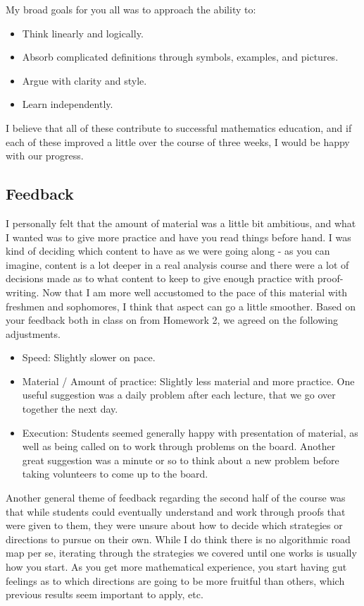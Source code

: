 \documentclass[11pt]{article}
\theoremstyle{plain}
\theoremstyle{definition}
\theoremstyle{remark}
\begin{document}
My broad goals for you all was to approach the ability to:
\begin{itemize}
    \item Think linearly and logically.
    \item Absorb complicated definitions through symbols, examples, and pictures.
    \item Argue with clarity and style.
    \item Learn independently.
\end{itemize}
I believe that all of these contribute to successful mathematics education, and if each of these improved a little over the course of three weeks, I would be happy with our progress.

\subsection*{Feedback}

I personally felt that the amount of material was a little bit ambitious, and what I wanted was to give more practice and have you read things before hand. I was kind of deciding which content to have as we were going along - as you can imagine, content is a lot deeper in a real analysis course and there were a lot of decisions made as to what content to keep to give enough practice with proof-writing. Now that I am more well accustomed to the pace of this material with freshmen and sophomores, I think that aspect can go a little smoother. Based on your feedback both in class on from Homework 2, we agreed on the following adjustments.
\begin{itemize}
    \item Speed: Slightly slower on pace.
    \item Material / Amount of practice: Slightly less material and more practice. One useful suggestion was a daily problem after each lecture, that we go over together the next day.
    \item Execution: Students seemed generally happy with presentation of material, as well as being called on to work through problems on the board. Another great suggestion was a minute or so to think about a new problem before taking volunteers to come up to the board.
\end{itemize}

Another general theme of feedback regarding the second half of the course was that while students could eventually understand and work through proofs that were given to them, they were unsure about how to decide which strategies or directions to pursue on their own. While I do think there is no algorithmic road map per se, iterating through the strategies we covered until one works is usually how you start. As you get more mathematical experience, you start having gut feelings as to which directions are going to be more fruitful than others, which previous results seem important to apply, etc.
\end{document}
